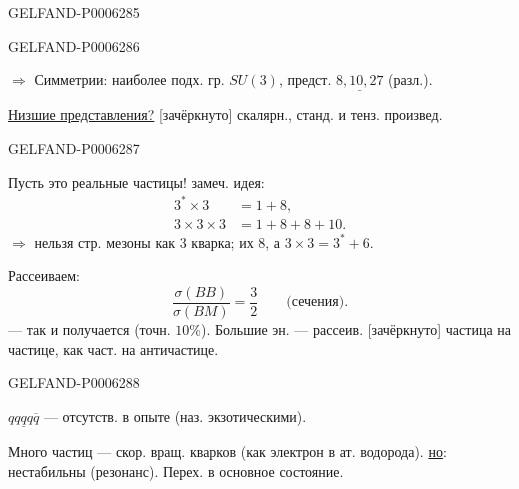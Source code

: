 \begin{GelfandAdjacentEvidence}{GELFAND-P000628}{5}

\end{GelfandAdjacentEvidence}
\begin{GelfandAdjacentEvidence}{GELFAND-P000628}{6}

\(\Rightarrow\) Симметрии: наиболее подх. гр. \(SU(3)\),
предст. \(\underline{8,10,27}\) (разл.).

\underline{Низшие представления?} [зачёркнуто] скалярн., станд. и тенз. произвед.
\end{GelfandAdjacentEvidence}
\begin{GelfandAdjacentEvidence}{GELFAND-P000628}{7}

Пусть это реальные частицы! замеч. идея:
\[
\begin{aligned}
3^*\times3&=1+8,\\
3\times3\times3&=1+8+8+10.
\end{aligned}
\]
\(\Rightarrow\) нельзя стр. мезоны как 3 кварка; их 8, а \(3\times3=3^*+6\).

Рассеиваем:
\[
\frac{\sigma(BB)}{\sigma(BM)}=\frac32
\qquad\text{(сечения)}.
\]
--- так и получается (точн. \(10\%\)).
Большие эн. --- рассеив. [зачёркнуто] частица на частице, как част. на античастице.
\end{GelfandAdjacentEvidence}
\begin{GelfandAdjacentEvidence}{GELFAND-P000628}{8}


\(\underline{qqqq\overline q}\) --- отсутств. в опыте (наз. экзотическими).

Много частиц --- скор. вращ. кварков (как электрон в ат. водорода).
\underline{но}: нестабильны (резонанс). Перех. в основное состояние.
\end{GelfandAdjacentEvidence}
